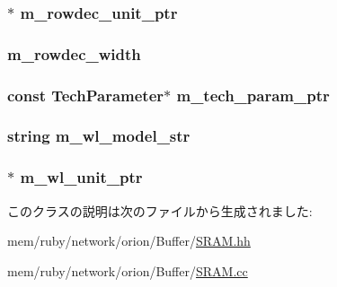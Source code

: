 \hypertarget{classSRAM_af248bbf358f029f6c226068df2f12a76}{
\subsubsection[{m\_\-rowdec\_\-unit\_\-ptr}]{$\ast$ {\bf m\_\-rowdec\_\-unit\_\-ptr}}}
\label{classSRAM_af248bbf358f029f6c226068df2f12a76}
\hypertarget{classSRAM_af0ba7be4a4c39caf7f8108d89cdda070}{
\subsubsection[{m\_\-rowdec\_\-width}]{ {\bf m\_\-rowdec\_\-width}}}
\label{classSRAM_af0ba7be4a4c39caf7f8108d89cdda070}
\hypertarget{classSRAM_a11d1644aa2bfe0e16783dface6fadf13}{
\subsubsection[{m\_\-tech\_\-param\_\-ptr}]{\setlength{\rightskip}{0pt plus 5cm}const {\bf TechParameter}$\ast$ {\bf m\_\-tech\_\-param\_\-ptr}}}
\label{classSRAM_a11d1644aa2bfe0e16783dface6fadf13}
\hypertarget{classSRAM_ac4e3f087da06ff2021c091e3801d43d1}{
\subsubsection[{m\_\-wl\_\-model\_\-str}]{\setlength{\rightskip}{0pt plus 5cm}string {\bf m\_\-wl\_\-model\_\-str}}}
\label{classSRAM_ac4e3f087da06ff2021c091e3801d43d1}
\hypertarget{classSRAM_a88ab323dc1aabb663a49f131fd43a549}{
\subsubsection[{m\_\-wl\_\-unit\_\-ptr}]{$\ast$ {\bf m\_\-wl\_\-unit\_\-ptr}}}
\label{classSRAM_a88ab323dc1aabb663a49f131fd43a549}


このクラスの説明は次のファイルから生成されました:\begin{DoxyCompactItemize}
\item 
mem/ruby/network/orion/Buffer/\hyperlink{SRAM_8hh}{SRAM.hh}\item 
mem/ruby/network/orion/Buffer/\hyperlink{SRAM_8cc}{SRAM.cc}\end{DoxyCompactItemize}
